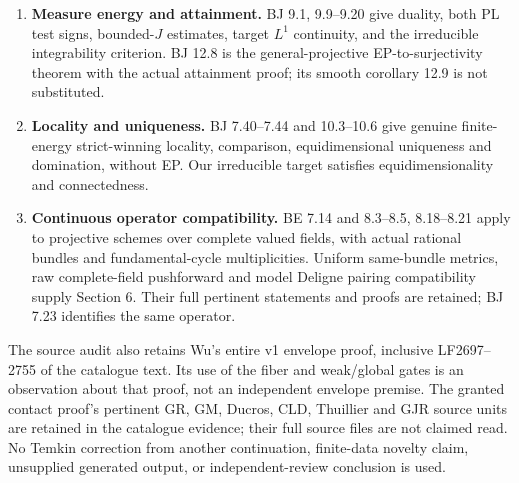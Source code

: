 \documentclass[
  10pt,
]{article}
\begin{document}
\begin{enumerate}
  their published scopes; Section 8 supplies the corrected elementary
  signs and factors.
\item
  \textbf{Measure energy and attainment.} BJ 9.1, 9.9--9.20 give
  duality, both PL test signs, bounded-\(J\) estimates, target \(L^1\)
  continuity, and the irreducible integrability criterion. BJ 12.8 is
  the general-projective EP-to-surjectivity theorem with the actual
  attainment proof; its smooth corollary 12.9 is not substituted.
\item
  \textbf{Locality and uniqueness.} BJ 7.40--7.44 and 10.3--10.6 give
  genuine finite-energy strict-winning locality, comparison,
  equidimensional uniqueness and domination, without EP. Our irreducible
  target satisfies equidimensionality and connectedness.
\item
  \textbf{Continuous operator compatibility.} BE 7.14 and 8.3--8.5,
  8.18--8.21 apply to projective schemes over complete valued fields,
  with actual rational bundles and fundamental-cycle multiplicities.
  Uniform same-bundle metrics, raw complete-field pushforward and model
  Deligne pairing compatibility supply Section 6. Their full pertinent
  statements and proofs are retained; BJ 7.23 identifies the same
  operator.
\end{enumerate}

The source audit also retains Wu's entire v1 envelope proof, inclusive
LF2697--2755 of the catalogue text. Its use of the fiber and weak/global
gates is an observation about that proof, not an independent envelope
premise. The granted contact proof's pertinent GR, GM, Ducros, CLD,
Thuillier and GJR source units are retained in the catalogue evidence;
their full source files are not claimed read. No Temkin correction from
another continuation, finite-data novelty claim, unsupplied generated
output, or independent-review conclusion is used.
\end{document}
